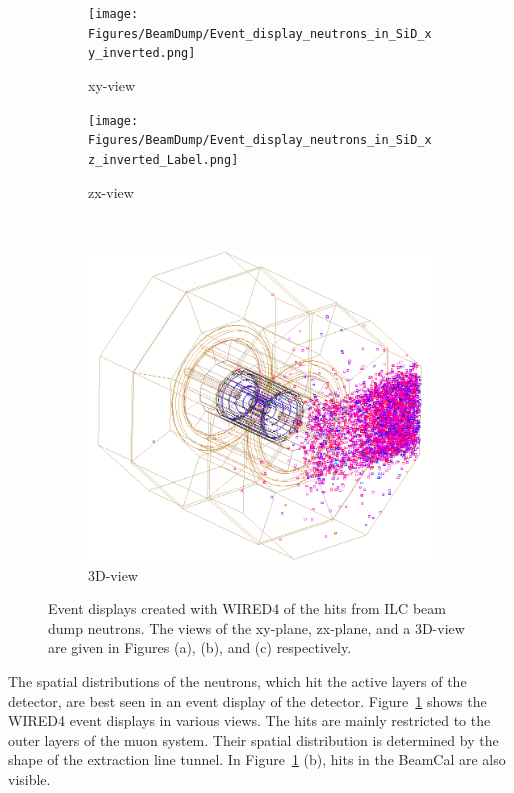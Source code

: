 \begin{figure}[!b]
 \centering
  \begin{subfigure}[b]{0.4\textwidth}
   \centering
    \texttt{[image: Figures/BeamDump/Event\_display\_neutrons\_in\_SiD\_xy\_inverted.png]}
   \caption{xy-view}
   \end{subfigure}
   \hfill
   \begin{subfigure}[b]{0.4\textwidth}
   \centering
    \texttt{[image: Figures/BeamDump/Event\_display\_neutrons\_in\_SiD\_xz\_inverted\_Label.png]}
   \caption{zx-view}
   \end{subfigure}\\
    \begin{subfigure}[b]{0.4\textwidth}
   \centering
    \includegraphics[width=\textwidth]{Figures/BeamDump/Event_display_neutrons_in_SiD_3D_inverted.png}
   \caption{3D-view}
   \end{subfigure}
   \caption[Event displays of the beam dump neutron hits in \sid]{Event displays created with WIRED4 of the \sid hits from ILC beam dump neutrons.
   The views of the xy-plane, zx-plane, and a 3D-view are given in Figures (a), (b), and (c) respectively.}
   \label{fig:BeamDumps:NeutronEventDisplays}
\end{figure} 
\FloatBarrier
\newpage
The spatial distributions of the neutrons, which hit the active layers of the \sid detector, are best seen in an event display of the \sid detector.
Figure~\ref{fig:BeamDumps:NeutronEventDisplays} shows the WIRED4 event displays in various views.
The hits are mainly restricted to the outer layers of the muon system.
Their spatial distribution is determined by the shape of the extraction line tunnel.
In Figure~\ref{fig:BeamDumps:NeutronEventDisplays} (b), hits in the \sid BeamCal are also visible.

